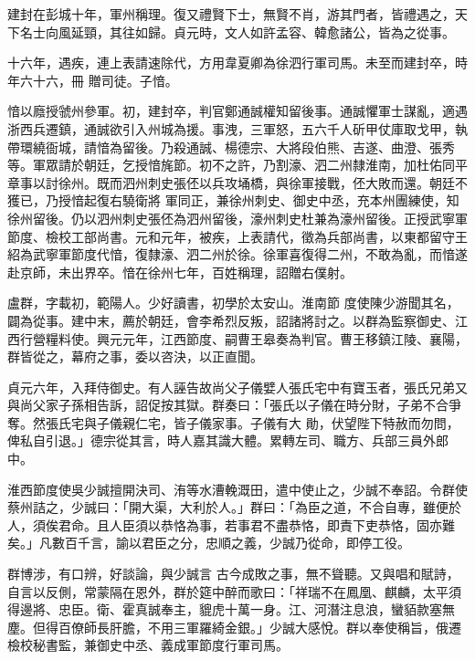 \begin{pinyinscope}
 建封在彭城十年，軍州稱理。復又禮賢下士，無賢不肖，游其門者，皆禮遇之，天下名士向風延頸，其往如歸。貞元時，文人如許孟容、韓愈諸公，皆為之從事。



 十六年，遇疾，連上表請速除代，方用韋夏卿為徐泗行軍司馬。未至而建封卒，時年六十六，冊
 贈司徒。子愔。



 愔以廕授虢州參軍。初，建封卒，判官鄭通誠權知留後事。通誠懼軍士謀亂，適遇浙西兵遷鎮，通誠欲引入州城為援。事洩，三軍怒，五六千人斫甲仗庫取戈甲，執帶環繞衙城，請愔為留後。乃殺通誠、楊德宗、大將段伯熊、吉遂、曲澄、張秀等。軍眾請於朝廷，乞授愔旄節。初不之許，乃割濠、泗二州隸淮南，加杜佑同平章事以討徐州。既而泗州刺史張伾以兵攻埇橋，與徐軍接戰，伾大敗而還。朝廷不獲已，乃授愔起復右驍衛將
 軍同正，兼徐州刺史、御史中丞，充本州團練使，知徐州留後。仍以泗州刺史張伾為泗州留後，濠州刺史杜兼為濠州留後。正授武寧軍節度、檢校工部尚書。元和元年，被疾，上表請代，徵為兵部尚書，以東都留守王紹為武寧軍節度代愔，復隸濠、泗二州於徐。徐軍喜復得二州，不敢為亂，而愔遂赴京師，未出界卒。愔在徐州七年，百姓稱理，詔贈右僕射。



 盧群，字載初，範陽人。少好讀書，初學於太安山。淮南節
 度使陳少游聞其名，闢為從事。建中末，薦於朝廷，會李希烈反叛，詔諸將討之。以群為監察御史、江西行營糧料使。興元元年，江西節度、嗣曹王皋奏為判官。曹王移鎮江陵、襄陽，群皆從之，幕府之事，委以咨決，以正直聞。



 貞元六年，入拜侍御史。有人誣告故尚父子儀嬖人張氏宅中有寶玉者，張氏兄弟又與尚父家子孫相告訴，詔促按其獄。群奏曰：「張氏以子儀在時分財，子弟不合爭奪。然張氏宅與子儀親仁宅，皆子儀家事。子儀有大
 勛，伏望陛下特赦而勿問，俾私自引退。」德宗從其言，時人嘉其識大體。累轉左司、職方、兵部三員外郎中。



 淮西節度使吳少誠擅開決司、洧等水漕輓溉田，遣中使止之，少誠不奉詔。令群使蔡州詰之，少誠曰：「開大渠，大利於人。」群曰：「為臣之道，不合自專，雖便於人，須俟君命。且人臣須以恭恪為事，若事君不盡恭恪，即責下吏恭恪，固亦難矣。」凡數百千言，諭以君臣之分，忠順之義，少誠乃從命，即停工役。



 群博涉，有口辨，好談論，與少誠言
 古今成敗之事，無不聳聽。又與唱和賦詩，自言以反側，常蒙隔在恩外，群於筵中醉而歌曰：「祥瑞不在鳳凰、麒麟，太平須得邊將、忠臣。衛、霍真誠奉主，貔虎十萬一身。江、河潛注息浪，蠻貊款塞無塵。但得百僚師長肝膽，不用三軍羅綺金銀。」少誠大感悅。群以奉使稱旨，俄遷檢校秘書監，兼御史中丞、義成軍節度行軍司馬。




\end{pinyinscope}
